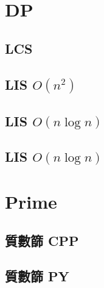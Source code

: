 %         

%         

\section{DP}
    \subsection{LCS}
        
    \subsection{LIS $O(n^2)$}
         
    \subsection{LIS $O(n \log n)$}
        
    \subsection{LIS $O(n \log n)$}
        
\section{Prime}
    \subsection{質數篩 CPP}
        
    \subsection{質數篩 PY}
        
